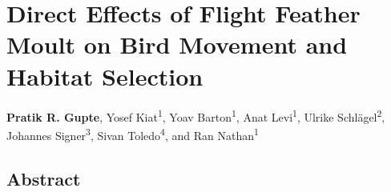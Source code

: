 \chapter{Direct Effects of Flight Feather Moult on Bird Movement and Habitat Selection}\label{ch:holeybirds}

{\noindent \textbf{Pratik R. Gupte}, Yosef Kiat\textsuperscript{1}, Yoav Barton\textsuperscript{1}, Anat Levi\textsuperscript{1}, Ulrike Schl{\"a}gel\textsuperscript{2}, Johannes Signer\textsuperscript{3}, Sivan Toledo\textsuperscript{4}, and Ran Nathan\textsuperscript{1}}


\section*{Abstract}

